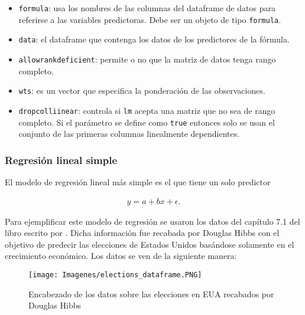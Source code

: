 \begin{itemize}
    \item \texttt{formula}: usa los nombres de las columnas del dataframe de datos para referirse a las variables predictoras. Debe ser un objeto de tipo \texttt{formula}. 
    
    \item \texttt{data}: el dataframe que contenga los datos de los predictores de la fórmula.
    
    \item \texttt{allowrankdeficient}: permite o no que la matriz de datos tenga rango completo.
    
    \item \texttt{wts}: es un vector que especifica la ponderación de las observaciones. 
    
    \item \texttt{dropcolliinear}: controla si \texttt{lm} acepta una matriz que no sea de rango completo. Si el parámetro se define como \texttt{true} entonces solo se usan el conjunto de las primeras columnas linealmente dependientes.
\end{itemize}



\subsubsection{Regresión lineal simple}
El modelo de regresión lineal más simple es el que tiene un solo predictor

\begin{equation*}
    \begin{aligned}
    y = a + bx + \epsilon.
    \end{aligned}
\end{equation*}

Para ejemplificar este modelo de regresión se usaron los datos del capítulo 7.1 del libro escrito por \cite{regression_other_stories}. Dicha información fue recabada por Douglas Hibbs con el objetivo de predecir las elecciones de Estados Unidos basándose solamente en el crecimiento económico. Los datos se ven de la siguiente manera: 

\begin{figure}[H]
\begin{center}
\texttt{[image: Imagenes/elections\_dataframe.PNG]}
\caption{Encabezado de los datos sobre las elecciones en EUA recabados por Douglas Hibbs}
  \label{elections_dataframe}
\end{center}
\end{figure}

